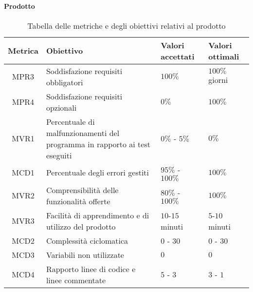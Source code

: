 \paragraph{Prodotto}
\begin{table}[H]
		\begin{center}
			\setlength{\aboverulesep}{0pt}
			\setlength{\belowrulesep}{0pt}
			\setlength{\extrarowheight}{.75ex}
			\begin{tabular}{ c C{6cm} C{3cm} C{3cm} }
				\textbf{Metrica} & \textbf{Obiettivo} & \textbf{Valori accettati} & \textbf{Valori ottimali}  \\
				\toprule
				MPR3 & Soddisfazione requisiti obbligatori & $100 \%$ & $100 \%$ giorni \\
				MPR4 & Soddisfazione requisiti opzionali & $ 0 \%$ & $ 100\%$ \\
				MVR1 & Percentuale di malfunzionamenti del programma in rapporto ai test eseguiti & $ 0\%$ - $5\%$  & $0\%$ \\
				MCD1 & Percentuale degli errori gestiti & $ 95\%$ - $100\% $ & $100\%$ \\
				MVR2 & Comprensibilità delle funzionalità offerte & $ 80\%$ - $100\% $ & $100\%$ \\
				MVR3 & Facilità di apprendimento e di utilizzo del prodotto & $10$-$15$ minuti & $5$-$10$ minuti \\
				MCD2 & Complessità ciclomatica & $0$ - $30$ & $0$ - $30$ \\
				MCD3 & Variabili non utilizzate & $0$ & $0$ \\
				MCD4 & Rapporto linee di codice e linee commentate & $5$ - $3$ & $3$ - $1$\\
				\bottomrule
			\end{tabular}
			\caption{Tabella delle metriche e degli obiettivi relativi al prodotto}
		\end{center}
	\end{table}